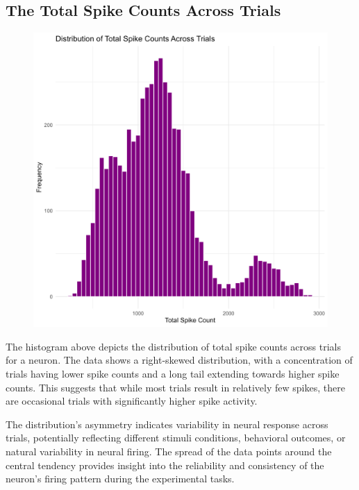 \documentclass{article}
\begin{document}
	\subsection{The Total Spike Counts Across Trials}
	\begin{figure}[htbp]
		\centering
		\includegraphics[scale = 0.4]{Pics/011}
		\label{fig:011}
	\end{figure}
	\par The histogram above depicts the distribution of total spike counts across trials for a neuron. The data shows a right-skewed distribution, with a concentration of trials having lower spike counts and a long tail extending towards higher spike counts. This suggests that while most trials result in relatively few spikes, there are occasional trials with significantly higher spike activity. 
	\par The distribution's asymmetry indicates variability in neural response across trials, potentially reflecting different stimuli conditions, behavioral outcomes, or natural variability in neural firing. The spread of the data points around the central tendency provides insight into the reliability and consistency of the neuron's firing pattern during the experimental tasks.
	\clearpage
\end{document}
